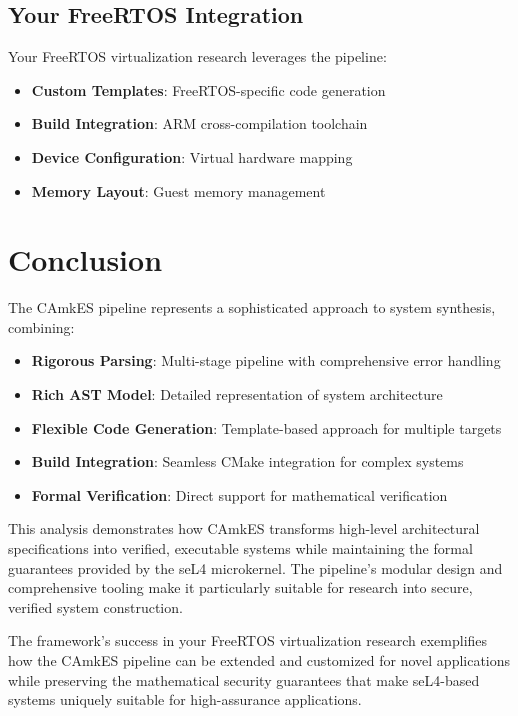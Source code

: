 \documentclass[12pt,a4paper]{article}
\begin{document}
\subsection{Your FreeRTOS Integration}
Your FreeRTOS virtualization research leverages the pipeline:

\begin{itemize}
    \item \textbf{Custom Templates}: FreeRTOS-specific code generation
    \item \textbf{Build Integration}: ARM cross-compilation toolchain
    \item \textbf{Device Configuration}: Virtual hardware mapping
    \item \textbf{Memory Layout}: Guest memory management
\end{itemize}

\section{Conclusion}

The CAmkES pipeline represents a sophisticated approach to system synthesis, combining:

\begin{itemize}
    \item \textbf{Rigorous Parsing}: Multi-stage pipeline with comprehensive error handling
    \item \textbf{Rich AST Model}: Detailed representation of system architecture
    \item \textbf{Flexible Code Generation}: Template-based approach for multiple targets
    \item \textbf{Build Integration}: Seamless CMake integration for complex systems
    \item \textbf{Formal Verification}: Direct support for mathematical verification
\end{itemize}

This analysis demonstrates how CAmkES transforms high-level architectural specifications into verified, executable systems while maintaining the formal guarantees provided by the seL4 microkernel. The pipeline's modular design and comprehensive tooling make it particularly suitable for research into secure, verified system construction.

The framework's success in your FreeRTOS virtualization research exemplifies how the CAmkES pipeline can be extended and customized for novel applications while preserving the mathematical security guarantees that make seL4-based systems uniquely suitable for high-assurance applications.
\end{document}
